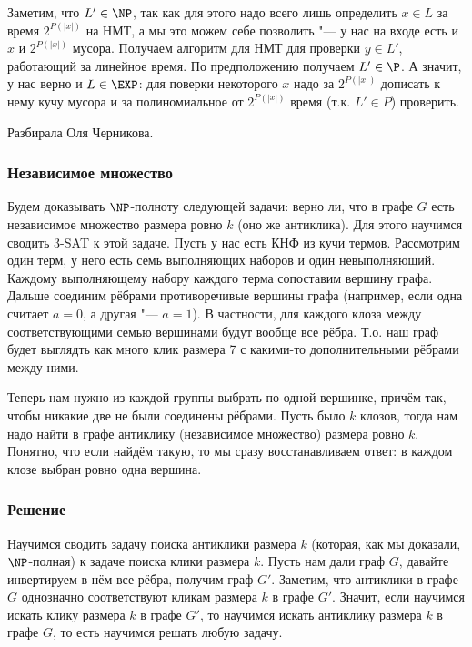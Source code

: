 		Заметим, что $L' \in \NP$, так как для этого надо всего лишь определить
		$x \in L$ за время $2^{P(|x|)}$ на НМТ, а мы это можем себе позволить "--- у нас на входе
		есть и $x$ и $2^{P(|x|)}$ мусора.
		Получаем алгоритм для НМТ для проверки $y \in L'$, работающий за линейное время.
		По предположению получаем $L' \in \P$.
		А значит, у нас верно и $L \in \EXP$: для поверки некоторого $x$ надо за $2^{P(|x|)}$ дописать
		к нему кучу мусора и за полиномиальное от $2^{P(|x|)}$ время (т.к. $L' \in P$) проверить.

	Разбирала Оля Черникова.

	\subsubsection{Независимое множество}
		Будем доказывать $\NP$-полноту следующей задачи: верно ли, что в графе $G$ есть независимое множество размера ровно $k$ (оно же антиклика).
		Для этого научимся сводить 3-SAT к этой задаче.
		Пусть у нас есть КНФ из кучи термов.
		Рассмотрим один терм, у него есть семь выполняющих наборов и один невыполняющий.
		Каждому выполняющему набору каждого терма сопоставим вершину графа.
		Дальше соединим рёбрами противоречивые вершины графа (например, если одна считает $a=0$, а другая "--- $a=1$).
		В частности, для каждого клоза между соответствующими семью вершинами будут вообще все рёбра.
		Т.о. наш граф будет выглядть как много клик размера 7 с какими-то дополнительными рёбрами между ними.

		Теперь нам нужно из каждой группы выбрать по одной вершинке, причём так, чтобы никакие две не были соединены рёбрами.
		Пусть было $k$ клозов, тогда нам надо найти в графе антиклику (независимое множество) размера ровно $k$.
		Понятно, что если найдём такую, то мы сразу восстанавливаем ответ: в каждом клозе выбран ровно одна вершина.

	\subsubsection{Решение}
		Научимся сводить задачу поиска антиклики размера $k$ (которая, как мы доказали, $\NP$-полная) к задаче поиска клики размера $k$.
		Пусть нам дали граф $G$, давайте инвертируем в нём все рёбра, получим граф $G'$.
		Заметим, что антиклики в графе $G$ однозначно соответствуют кликам размера $k$ в графе $G'$.
		Значит, если научимся искать клику размера $k$ в графе $G'$, то научимся искать антиклику размера
		$k$ в графе $G$, то есть научимся решать любую задачу.

